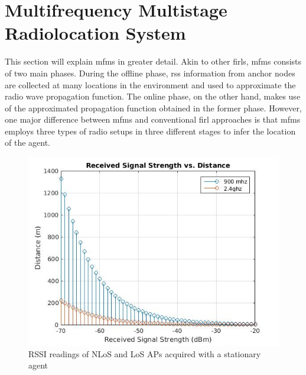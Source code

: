 \section{Multifrequency Multistage Radiolocation System}
\label{sec:mfms}
    This section will explain \gls{mfms} in greater detail.
    Akin to other \gls{firl}s, \gls{mfms} consists of two main phases.
    During the offline phase, \gls{rss} information from anchor nodes are collected at many locations in the environment and used to approximate the radio wave propagation function.
    The online phase, on the other hand, makes use of the approximated propagation function obtained in the former phase.
    However, one major difference between \gls{mfms} and conventional \gls{firl} approaches is that \gls{mfms} employs three types of radio setups in three different stages to infer the location of the agent.

    \begin{figure}[thpb]
        \centering
        \includegraphics[width=\linewidth]{figures/rss-vs-distance.jpg}
        \caption{\label{fig:log-distance}RSSI readings of NLoS and LoS APs acquired with a stationary agent}
    \end{figure}

